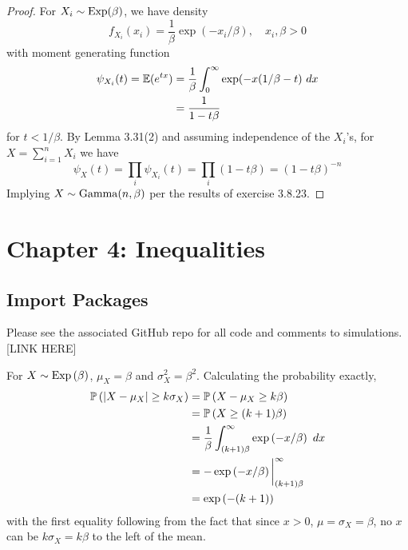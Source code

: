 \documentclass[a4paper]{article}
\begin{document}
\begin{proof}[Proof] 
For \(X_{i} \sim \operatorname{Exp}(\beta )\), we have density
\[
	f_{X_{i}}(x_{i}) = \frac{1}{\beta } \exp(-x_{i}/\beta ), \quad x_{i}, \beta >0
\]
with moment generating function
\begin{align*}
	\psi_{X_{i}}(t) = \mathbb{E}(e^{tx}) & = \frac{1}{\beta } \int^{\infty}_{0} \exp(-x(1/\beta -t) \ dx  \\
	 & = \frac{1}{1-t \beta } 
\end{align*}
for \( t < 1/\beta \). By Lemma 3.31(2) and assuming independence of the \(X_{i}\)'s, for \(X = \sum_{i=1}^{n} X_{i}\) we have
\[
	\psi_{X}(t) = \prod_{i} \psi_{X_{i}}(t) = \prod_{i} (1 - t \beta ) = (1-t \beta )^{-n}   
\]
Implying \(X \sim \operatorname{Gamma}(n, \beta )\) per the results of exercise 3.8.23.

\end{proof}


\newpage
\section{Chapter 4: Inequalities}

\subsection*{Import Packages}

Please see the associated GitHub repo for all code and comments to simulations. [LINK HERE]


For \(X \sim \operatorname{Exp}\left( \beta  \right)\), \(\mu_{X} = \beta \) and \(\sigma_{X}^{2} = \beta^{2}\). Calculating the probability exactly,
\begin{align*}
	\Prob\left( \abs{X - \mu_{X}} \ge k \sigma_{X} \right) & = \Prob\left( X - \mu_{X} \ge k \beta \right)  \\
	 & = \Prob\left( X \ge (k+1)\beta \right)  \\ 
	 & = \frac{1}{\beta} \int^{\infty}_{(k+1)\beta } \exp\left( -x/\beta  \right)  \ dx \\
	 & = -\exp\left( -x/\beta  \right) \bigg|^{\infty}_{(k+1)\beta } \\
	 & = \exp\left( -(k+1) \right)
\end{align*}
with the first equality following from the fact that since \(x > 0\), \(\mu = \sigma_{X} = \beta \), no \(x\) can be \(k \sigma_{X} = k \beta \) to the left of the mean.
\end{document}
